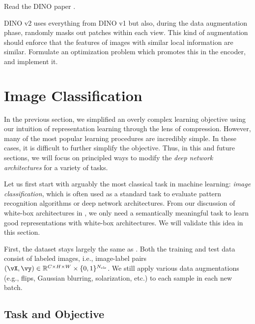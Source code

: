 \documentclass[\toplevelprefix/book-main.tex]{subfiles}
\begin{document}
\begin{exercise}
    Read the DINO paper \cite{caron2021emerging}.
\end{exercise}

\begin{exercise}
    DINO v2 \cite{oquab2023dinov2} uses everything from DINO v1 but also, during the data augmentation phase, randomly masks out patches within each view. This kind of augmentation should enforce that the features of images with similar local information are similar. Formulate an optimization problem which promotes this in the encoder, and implement it.
\end{exercise}


\section{Image Classification}\label{sec:image_classification}

In the previous section, we simplified an overly complex learning objective using our intuition of representation learning through the lens of compression. However, many of the most popular learning procedures are incredibly simple. In these cases, it is difficult to further simplify the objective. Thus, in this and future sections, we will focus on principled ways to modify the \textit{deep network architectures} for a variety of tasks.

Let us first start with arguably the most classical task in machine learning: \textit{image classification}, which is often used as a standard task to evaluate pattern recognition algorithms or deep network architectures. From our discussion of white-box architectures in , we only need a semantically meaningful task to learn good representations with white-box architectures. We will validate this idea in this section.

First, the dataset stays largely the same as . Both the training and test data consist of labeled images, i.e., image-label pairs \((\vX, \vy) \in \R^{C \times H \times W} \times \{0, 1\}^{N_{\cls}}\). We still apply various data augmentations (e.g., flips, Gaussian blurring, solarization, etc.) to each sample in each new batch. 

\subsection{Task and Objective} \label{sub:image_classification_objective}
\end{document}
